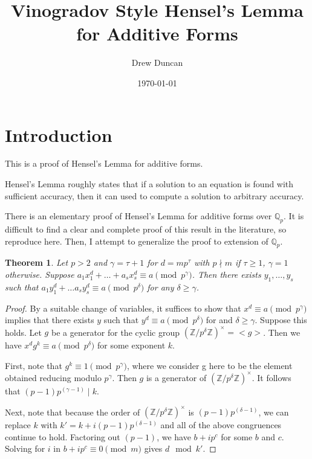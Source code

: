 \documentclass{article}
\title{Vinogradov Style Hensel's Lemma for Additive Forms}
\author{Drew Duncan}
\date{\today}
\newtheorem{theorem}{Theorem}
\begin{document}
\maketitle

\section{Introduction}
This is a proof of Hensel's Lemma for additive forms.

Hensel's Lemma roughly states that if a solution to an equation is found with sufficient accuracy, then it can used to compute a solution to arbitrary accuracy.

There is an elementary proof of Hensel's Lemma for additive forms over $\mathbb{Q}_p$.  It is difficult to find a clear and complete proof of this result in the literature, so reproduce here.  Then, I attempt to generalize the proof to extension of $\mathbb{Q}_p$.

\begin{theorem}
Let $p>2$ and  $\gamma = \tau+1$ for $d=m p^\tau$ with $p \nmid m$ if $\tau \ge 1$, $\gamma = 1$ otherwise.  Suppose $a_1 x_1^d + \ldots + a_s x_s^d \equiv a \pmod{p^\gamma}$.  Then there exists $y_1, \ldots, y_s$ such that $a_1 y_1^d + \ldots a_s y_s^d \equiv a \pmod{p^\delta}$ for any $\delta \ge \gamma$.
\end{theorem}

\begin{proof}
By a suitable change of variables, it suffices to show that $x^d \equiv a \pmod{p^\gamma}$ implies that there exists $y$ such that $y^d \equiv a \pmod{p^\delta}$ for and $\delta \ge \gamma$.  Suppose this holds.  Let $g$ be a generator for the cyclic group $(\mathbb{Z}/p^\delta\mathbb{Z})^\times = <g>$.  Then we have $x^d g^k \equiv a \pmod{p^\delta}$ for some exponent $k$.

First, note that $g^k \equiv 1 \pmod{p^\gamma}$, where we consider g here to be the element obtained reducing modulo $p^\gamma$.  Then $g$ is a generator of $(\mathbb{Z}/p^\delta\mathbb{Z})^\times$.  It follows that $(p-1)p^{(\gamma-1)} \mid k$.

Next, note that because the order of $(\mathbb{Z}/p^\delta\mathbb{Z})^\times$ is $(p-1)p^{(\delta-1)}$, we can replace $k$ with $k' = k + i(p-1)p^{(\delta-1)}$ and all of the above congruences continue to hold.  Factoring out $(p-1)$, we have $b + ip^c$ for some $b$ and $c$.  Solving for $i$ in $b + ip^c \equiv 0 \pmod{m}$ gives $d \mod k'$.
\end{proof}
\end{document}
